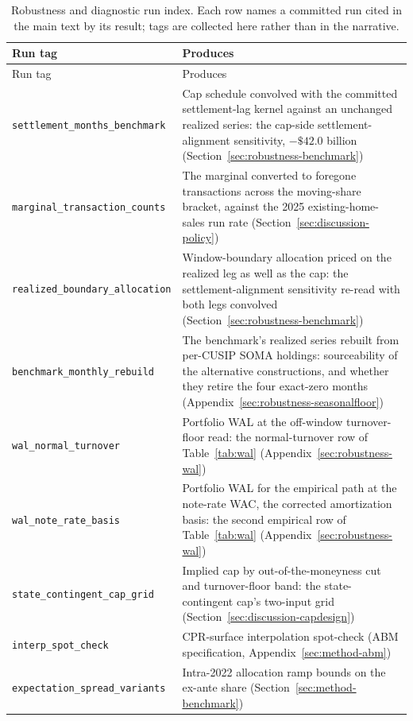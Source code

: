 \documentclass[12pt]{article}
\begin{document}
{\footnotesize
\begin{longtable}{@{}p{5.4cm}p{8.8cm}@{}}
\caption{Robustness and diagnostic run index. Each row names a committed run cited in the main text by its result; tags are collected here rather than in the narrative.}
\label{tab:runindex}\\
\toprule
Run tag & Produces \\
\midrule
\endfirsthead
\toprule
Run tag & Produces \\
\midrule
\endhead
\texttt{settlement\_months\_benchmark} & Cap schedule convolved with the committed settlement-lag kernel against an unchanged realized series: the cap-side settlement-alignment sensitivity, $-\$42.0$ billion (Section~\ref{sec:robustness-benchmark}) \\
\texttt{marginal\_transaction\_counts} & The marginal converted to foregone transactions across the moving-share bracket, against the 2025 existing-home-sales run rate (Section~\ref{sec:discussion-policy}) \\
\texttt{realized\_boundary\_allocation} & Window-boundary allocation priced on the realized leg as well as the cap: the settlement-alignment sensitivity re-read with both legs convolved (Section~\ref{sec:robustness-benchmark}) \\
\texttt{benchmark\_monthly\_rebuild} & The benchmark's realized series rebuilt from per-CUSIP SOMA holdings: sourceability of the alternative constructions, and whether they retire the four exact-zero months (Appendix~\ref{sec:robustness-seasonalfloor}) \\
\texttt{wal\_normal\_turnover} & Portfolio WAL at the off-window turnover-floor read: the normal-turnover row of Table~\ref{tab:wal} (Appendix~\ref{sec:robustness-wal}) \\
\texttt{wal\_note\_rate\_basis} & Portfolio WAL for the empirical path at the note-rate WAC, the corrected amortization basis: the second empirical row of Table~\ref{tab:wal} (Appendix~\ref{sec:robustness-wal}) \\
\texttt{state\_contingent\_cap\_grid} & Implied cap by out-of-the-moneyness cut and turnover-floor band: the state-contingent cap's two-input grid (Section~\ref{sec:discussion-capdesign}) \\
\texttt{interp\_spot\_check} & CPR-surface interpolation spot-check (ABM specification, Appendix~\ref{sec:method-abm}) \\
\texttt{expectation\_spread\_variants} & Intra-2022 allocation ramp bounds on the ex-ante share (Section~\ref{sec:method-benchmark}) \\

\end{longtable}}
\end{document}
